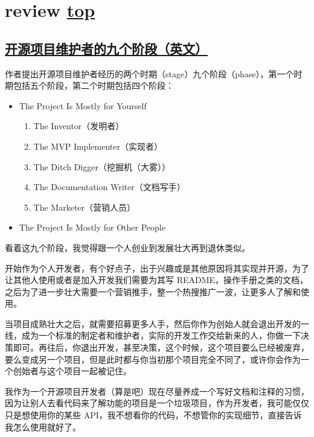 \section{review \hyperref[chap:w5]{top}}\label{w5:review}

\subsection{\href{https://nibblestew.blogspot.com/2020/11/the-nine-phases-of-open-source-project.html}{开源项目维护者的九个阶段（英文）}}

作者提出开源项目维护者经历的两个时期（stage）九个阶段（phase），第一个时期包括五个阶段，第二个时期包括四个阶段：

\begin{itemize}
\item The Project Is Mostly for Yourself
  \begin{enumerate}
    \item The Inventor（发明者）
    \item The MVP Implementer（实现者）
    \item The Ditch Digger（挖掘机（大雾））
    \item The Documentation Writer（文档写手）
    \item The Marketer（营销人员）
  \end{enumerate}
\item The Project Is Mostly for Other People
\end{itemize}

看着这九个阶段，我觉得跟一个人创业到发展壮大再到退休类似。

开始作为个人开发者，有个好点子，出于兴趣或是其他原因将其实现并开源，为了让其他人使用或者是加入开发我们需要为其写 README，操作手册之类的文档，之后为了进一步壮大需要一个营销推手，整一个热搜推广一波，让更多人了解和使用。

当项目成熟壮大之后，就需要招募更多人手，然后你作为创始人就会退出开发的一线，成为一个标准的制定者和维护者，实际的开发工作交给新来的人，你做一下决策即可。再往后，你退出开发，甚至决策，这个时候，这个项目要么已经被废弃，要么变成另一个项目，但是此时都与你当初那个项目完全不同了，或许你会作为一个创始者与这个项目一起被记住。

我作为一个开源项目开发者（算是吧）现在尽量养成一个写好文档和注释的习惯，因为让别人去看代码来了解功能的项目是一个垃圾项目，作为开发者，我可能仅仅只是想使用你的某些 API，我不想看你的代码，不想管你的实现细节，直接告诉我怎么使用就好了。

